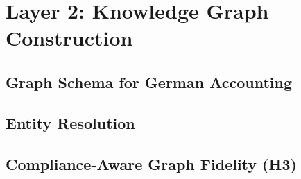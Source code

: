 \chapter{Layer 2: Knowledge Graph Construction}
\label{ch:knowledge-graph}


\section{Graph Schema for German Accounting}
\label{sec:kg-schema}

\section{Entity Resolution}
\label{sec:kg-er}

\section{Compliance-Aware Graph Fidelity (H3)}
\label{sec:kg-fidelity}
